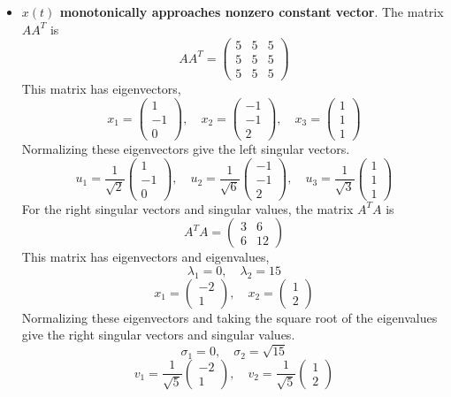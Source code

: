 \documentclass{article}
\begin{document}
\begin{itemize}
  \item {\bf $x(t)$ monotonically approaches nonzero constant vector}. The
  matrix $A A^T$ is
  $$ A A^T = \begin{pmatrix}
    5 & 5 & 5 \\
    5 & 5 & 5 \\
    5 & 5 & 5
  \end{pmatrix} $$
  This matrix has eigenvectors,
  $$ x_1 = \begin{pmatrix}
    1 \\
    -1 \\
    0
  \end{pmatrix},\quad x_2 = \begin{pmatrix}
    -1 \\
    -1 \\
    2
  \end{pmatrix},\quad x_3 = \begin{pmatrix}
    1 \\
    1 \\
    1
  \end{pmatrix} $$
  Normalizing these eigenvectors give the left singular vectors. 
  $$ u_1 = \frac{1}{\sqrt{2}}\begin{pmatrix}
    1 \\
    -1 \\
    0
  \end{pmatrix},\quad u_2 = \frac{1}{\sqrt{6}}\begin{pmatrix}
    -1 \\
    -1 \\
    2
  \end{pmatrix},\quad u_3 = \frac{1}{\sqrt{3}}\begin{pmatrix}
    1 \\
    1 \\
    1
  \end{pmatrix} $$
  For the right singular vectors and singular values, the matrix $A^T A$ is
  $$ A^T A = \begin{pmatrix}
    3 & 6 \\
    6 & 12
  \end{pmatrix} $$
  This matrix has eigenvectors and eigenvalues,
  $$ \lambda_1 = 0,\quad \lambda_2 = 15 $$
  $$ x_1 = \begin{pmatrix}
    -2 \\
    1
  \end{pmatrix},\quad x_2 = \begin{pmatrix}
    1 \\
    2
  \end{pmatrix} $$
  Normalizing these eigenvectors and taking the square root of the
  eigenvalues give the right singular vectors and singular values.
  $$ \sigma_1 = 0,\quad \sigma_2 = \sqrt{15} $$
  $$ v_1 = \frac{1}{\sqrt{5}}\begin{pmatrix}
    -2 \\
    1
  \end{pmatrix},\quad v_2 = \frac{1}{\sqrt{5}}\begin{pmatrix}
    1 \\
    2
  \end{pmatrix} $$


\end{itemize}
\end{document}
